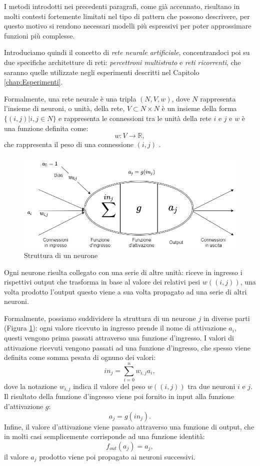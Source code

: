 \documentclass[../../main.tex]{subfiles}
\begin{document}
I metodi introdotti nei precedenti paragrafi, come già accennato, risultano in molti contesti fortemente limitati nel tipo di pattern che possono descrivere, per questo motivo si rendono necessari modelli più espressivi per poter approssimare funzioni più complesse.

Introduciamo quindi il concetto di \textit{rete neurale artificiale}, concentrandoci poi su due specifiche architetture di reti: \textit{percettroni multistrato} e \textit{reti ricorrenti}, che saranno quelle utilizzate negli esperimenti descritti nel Capitolo \ref{chap:Esperimenti}.  

Formalmente, una rete neurale è una tripla $(N, V, w)$, dove $N$ rappresenta l'insieme di neuroni, o unità, della rete, $V \subset N \times N$ è un insieme della forma $\{(i, j) | i,j \in N\}$ e rappresenta le connessioni tra le unità della rete $i$ e $j$ e $w$ è una funzione definita come:
\[w : V \rightarrow \mathbb{R},\]
che rappresenta il peso di una connessione $(i, j)$ \cite{kriesel2007bin}.

\begin{figure}[H]
    \centering
    \includegraphics[width=\textwidth]{immagini/4_2/neuron.png}
    \caption{Struttura di un neurone}
    \label{fig:neuron}
\end{figure}

Ogni neurone risulta collegato con una serie di altre unità: riceve in ingresso i rispettivi output che trasforma in base al valore dei relativi pesi $w((i,j))$, una volta prodotto l'output questo viene a sua volta propagato ad una serie di altri neuroni.

Formalmente, possiamo suddividere la struttura di un neurone $j$ in diverse parti (Figura \ref{fig:neuron}): ogni valore ricevuto in ingresso prende il nome di attivazione $a_i$, questi vengono prima passati attraverso una funzione d'ingresso. I valori di attivazione ricevuti vengono passati ad una funzione d'ingresso, che spesso viene definita come somma pesata di ognuno dei valori:
\[in_j = \sum_{i=0}^n {w_{i,j} a_i},\]
dove la notazione $w_{i,j}$ indica il valore del peso $w((i,j))$ tra due neuroni $i$ e $j$. Il risultato della funzione d'ingresso viene poi fornito in input alla funzione d'attivazione $g$:
\[a_j = g(in_j).\]
Infine, il valore d'attivazione viene passato attraverso una funzione di output, che in molti casi semplicemente corrisponde ad una funzione identità:
\[f_{out}(a_j) = a_j,\]
il valore $a_j$ prodotto viene poi propagato ai neuroni successivi.
\end{document}
